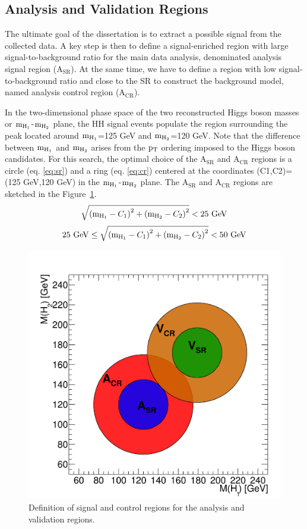 \clearpage

\subsection{Analysis and Validation Regions} \label{sec:analysisregions}
The ultimate goal of the dissertation is to extract a possible signal from the collected data. A key step is then to define a signal-enriched region with large signal-to-background ratio for the main data analysis, denominated analysis signal region ($\mathrm{A_{SR}}$). At the same time, we have to define a region with low signal-to-background ratio and close to the SR to construct the background model, named analysis control region ($\mathrm{A_{CR}}$). 

In the two-dimensional phase space of the two reconstructed Higgs boson masses or $\mathrm{m_{H_{1}}}$-$\mathrm{m_{H_{2}}}$ plane, the HH signal events populate the region surrounding the peak located around $\mathrm{m_{H_{1}}}$=125 GeV and $\mathrm{m_{H_{2}}}$=120 GeV. Note that the difference between $\mathrm{m_{H_{1}}}$ and $\mathrm{m_{H_{2}}}$ arises from the $\mathrm{p_{T}}$ ordering imposed to the Higgs boson candidates. For this search, the optimal choice of the $\mathrm{A_{SR}}$ and $\mathrm{A_{CR}}$ regions is a circle (eq. \ref{eq:sr}) and a ring (eq. \ref{eq:cr}) centered at the coordinates (C1,C2)=(125 GeV,120 GeV) in the $\mathrm{m_{H_{1}}}$-$\mathrm{m_{H_{2}}}$ plane. The $\mathrm{A_{SR}}$ and $\mathrm{A_{CR}}$ regions are sketched in the Figure~\ref{event_selection:fig:vsrcr}.
\begin{equation}\label{eq:sr}
\sqrt{ \left(\mathrm{m_{H_{1}}}-C_1\right)^{2} +   \left(\mathrm{m_{H_{2}}}-C_2\right)^{2}   } < 25~\mathrm{GeV} 
\end{equation}
\begin{equation}\label{eq:cr}
25~\mathrm{GeV} \leq \sqrt{ \left(\mathrm{m_{H_{1}}}-C_1\right)^{2} + \left(\mathrm{m_{H_{2}}}-C_2\right)^{2}   } < 50~\mathrm{GeV}\end{equation}
\begin{figure}[ht!]
\centering
\includegraphics[width=0.4\linewidth]{Figures/AnalysisStrategy/eventselection/regions/vsrcrcircle.png}
\caption[Definition of signal and control regions for the analysis and validation regions]{Definition of signal and control regions for the analysis and validation regions.}
\label{event_selection:fig:vsrcr}
\end{figure}


